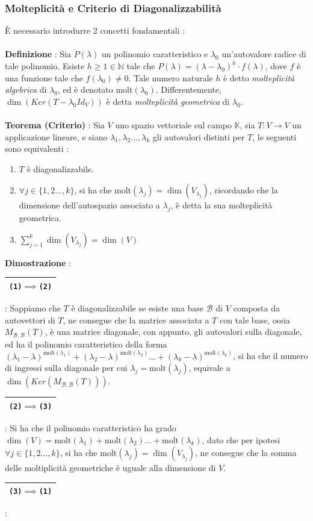 \documentclass[12pt, letterpaper]{article}
\newcommand{\K}{{\mathbb K}}
\newcommand{\N}{{\mathbb N}}
\newcommand{\B}{{\mathcal B}}
\newcommand{\acc}{\\\hphantom{}\\}
\newcommand{\boxedMath}[1]{\begin{tabular}{|c|}\hline \texttt{#1} \\ \hline\end{tabular} :}
\begin{document}
\subsubsection{Molteplicità e Criterio di Diagonalizzabilità}
È necessario introdurre 2 concetti fondamentali :\acc 
\textbf{Definizione} : Sia \(P(\lambda)\) un polinomio caratteristico e \(\lambda_0\) un'autovalore radice di tale polinomio. 
Esiste \(h\ge 1\in\N\) tale che \(P(\lambda)=(\lambda-\lambda_0)^h\cdot f(\lambda)\), dove \(f\) è una funzione 
tale che \(f(\lambda_0)\ne0\). Tale numero naturale \(h\) è detto \textit{molteplicità algebrica} di \(\lambda_0\), ed 
è denotato molt\((\lambda_0)\). Differentemente, 
\(\dim(Ker(T-\lambda_0Id_V))\) è detta \textit{molteplicità geometrica} di \(\lambda_0\).\acc 
\textbf{Teorema (Criterio)} : Sia \(V\) uno spazio vettoriale sul 
campo \(\K\), sia \(T:V\rightarrow V\) un applicazione lineare, e siano 
\(\lambda_1,\lambda_2\dots,\lambda_k\) gli autovalori distinti per \(T\),  le seguenti sono equivalenti :\begin{enumerate}
    \item \(T\) è diagonalizzabile.
    \item \(\forall j \in \{1,2\dots,k\}\), si ha che molt\((\lambda_j)=\dim(V_{\lambda_j})\), ricordando che 
    la dimensione dell'autospazio associato a \(\lambda_j\), è detta la sua molteplicità geometrica.
    \item \(\displaystyle\sum_{j=1}^k\dim(V_{\lambda_j})=\dim(V)\)
\end{enumerate}
\textbf{Dimostrazione} : \boxedMath{(1)\(\implies\)(2)} Sappiamo che \(T\) è diagonalizzabile se esiste una base \(\B\) 
di \(V\) composta da autovettori di \(T\), ne consegue che la matrice associata a \(T\) con tale base,
ossia \(M_{\B,\B}(T)\), è una matrice 
diagonale, con appunto, gli autovalori sulla diagonale, ed ha il polinomio caratteristico 
della forma \((\lambda_1-\lambda)^{\text{molt}(\lambda_1)}+(\lambda_2-\lambda)^{\text{molt}(\lambda_2)}
\dots +(\lambda_k-\lambda)^{\text{molt}(\lambda_k)}\), si ha che il numero di ingressi 
sulla diagonale per cui \(\lambda_j=\text{molt}(\lambda_j)\), equivale a \(\dim(Ker(M_{\B,\B}(T)))\).\\
\boxedMath{(2)\(\implies\)(3)} Si ha che il polinomio caratteristico ha grado \(\dim(V)=\text{molt}(\lambda_1)
+\text{molt}(\lambda_2)\dots+\text{molt}(\lambda_k)\), dato che per ipotesi 
\(\forall j \in \{1,2\dots,k\}\), si ha che molt\((\lambda_j)=\dim(V_{\lambda_j})\), ne consegue che 
la somma delle moltiplicità geometriche è uguale alla dimensione di \(V\). \boxedMath{(3)\(\implies\)(1)} 
\end{document}
